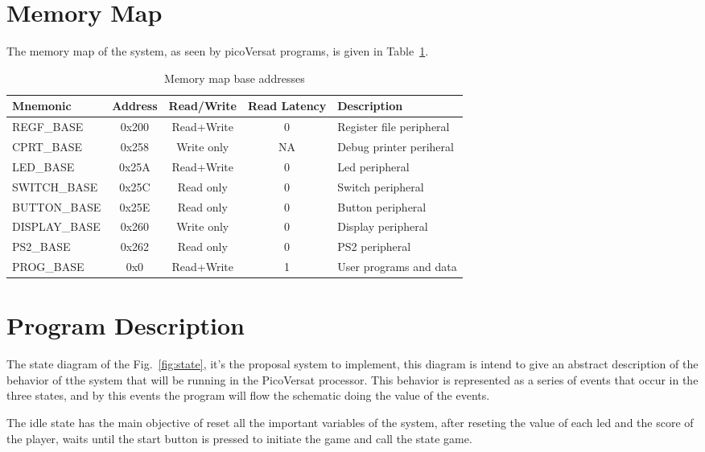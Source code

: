 \section{Memory Map}
\label{sec:mem_map}

The memory map of the system, as seen by picoVersat programs, is given in
Table~\ref{tab:memmap}.

\begin{table}[!htbp]
  \centering
    \begin{tabular}{|p{3cm}|c|c|c|p{4cm}|}
    \hline 
    {\bf Mnemonic} & {\bf Address} & {\bf Read/Write} & {\bf Read Latency} & {\bf Description} \\
    \hline \hline 
     REGF\_BASE & 0x200 & Read+Write & 0 & Register file peripheral \\
    \hline
     CPRT\_BASE & 0x258 & Write only & NA & Debug printer periheral \\
    \hline
     LED\_BASE & 0x25A & Read+Write & 0 & Led peripheral \\
    \hline
     SWITCH\_BASE & 0x25C & Read only & 0 & Switch peripheral \\
    \hline
     BUTTON\_BASE & 0x25E & Read only & 0 & Button peripheral \\
    \hline
     DISPLAY\_BASE & 0x260 & Write only & 0 & Display peripheral \\
    \hline
     PS2\_BASE & 0x262 & Read only & 0 & PS2 peripheral \\
    \hline
     PROG\_BASE & 0x0 & Read+Write & 1 & User programs and data \\
    \hline
    \end{tabular}
  \caption{Memory map base addresses}
  \label{tab:memmap}
\end{table}

\clearpage
\section{Program Description}
\label{sec:pgrm}
The state diagram of the Fig.~\ref{fig:state}, it's the proposal system to implement, this diagram is intend to give an abstract description of the behavior of tthe system that will be running in the PicoVersat processor. This behavior is represented as a series of events that occur in the three states, and by this events the program will flow the schematic doing the value of the events.

\noindent
The idle state has the main objective of reset all the important variables of the system, after reseting the value of each led and the score of
the player, waits until the start button is pressed to initiate the game and call the state game.

